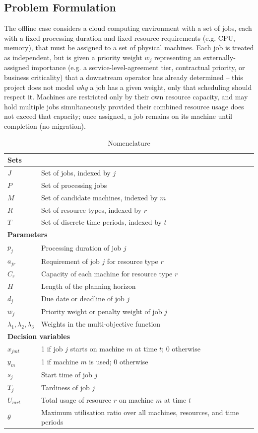 \documentclass[12pt]{article}
\begin{document}
\subsection{Problem Formulation}
The offline case considers a cloud computing environment with a set of jobs, each with a fixed processing duration and fixed resource requirements (e.g. CPU, memory), that must be assigned to a set of physical machines. Each job is treated as independent, but is given a priority weight $w_j$ representing an externally-assigned importance (e.g. a service-level-agreement tier, contractual priority, or business criticality) that a downstream operator has already determined -- this project does not model \emph{why} a job has a given weight, only that scheduling should respect it. Machines are restricted only by their own resource capacity, and may hold multiple jobs simultaneously provided their combined resource usage does not exceed that capacity; once assigned, a job remains on its machine until completion (no migration).

\begin{table}[htbp]
\centering
\caption{Nomenclature}
\label{tab:nomenclature}
\begin{tabular}{ll}
\hline
\multicolumn{2}{l}{\textbf{Sets}}\\
\hline
$J$ & Set of jobs, indexed by $j$ \\
$P$ & Set of processing jobs \\
$M$ & Set of candidate machines, indexed by $m$ \\
$R$ & Set of resource types, indexed by $r$ \\
$T$ & Set of discrete time periods, indexed by $t$ \\
\hline
\multicolumn{2}{l}{\textbf{Parameters}}\\
\hline
$p_j$ & Processing duration of job $j$ \\
$a_{jr}$ & Requirement of job $j$ for resource type $r$ \\
$C_r$ & Capacity of each machine for resource type $r$ \\
$H$ & Length of the planning horizon \\
$d_j$ & Due date or deadline of job $j$ \\
$w_j$ & Priority weight or penalty weight of job $j$ \\
$\lambda_1,\lambda_2,\lambda_3$ & Weights in the multi-objective function \\
\hline
\multicolumn{2}{l}{\textbf{Decision variables}}\\
\hline
$x_{jmt}$ & 1 if job $j$ starts on machine $m$ at time $t$; 0 otherwise \\
$y_m$ & 1 if machine $m$ is used; 0 otherwise \\
$s_j$ & Start time of job $j$ \\
$T_j$ & Tardiness of job $j$ \\
$U_{mrt}$ & Total usage of resource $r$ on machine $m$ at time $t$ \\
$\theta$ & Maximum utilisation ratio over all machines, resources, and time periods \\
\hline
\end{tabular}
\end{table}
\end{document}
